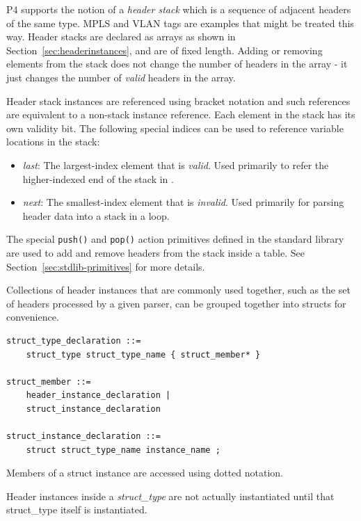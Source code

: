 \documentclass[12pt]{article}
\begin{document}

P4 supports the notion of a \textit{header stack} which is a sequence of
adjacent headers of the same type. MPLS and VLAN tags are examples that might
be treated this way.  Header stacks are declared as arrays as shown in
Section~\ref{sec:headerinstances}, and are of fixed length. Adding or removing
elements from the stack does not change the number of headers in the array - it
just changes the number of \textit{valid} headers in the array.

Header stack instances are referenced using bracket notation and such
references are equivalent to a non-stack instance reference. Each
element in the stack has its own validity bit. The following special
indices can be used to reference variable locations in the stack:
\begin{itemize}
\item
\textit{last}: The largest-index element that is \textit{valid}.
Used primarily to refer the higher-indexed end of the stack in \matchaction.
\item
\textit{next}: The smallest-index element that is \textit{invalid}.
Used primarily for parsing header data into a stack in a loop.
\end{itemize}
The special \texttt{push()} and \texttt{pop()} action primitives defined
in the standard library are used to add and remove headers from the stack
inside a \matchaction table. See Section~\ref{sec:stdlib-primitives} for more
details.


Collections of header instances that are commonly used together, such
as the set of headers processed by a given parser, can be grouped together
into structs for convenience.

\begin{lstlisting}[style=BNFstyle]
struct_type_declaration ::=
    struct_type struct_type_name { struct_member* }

struct_member ::=
    header_instance_declaration |
    struct_instance_declaration

struct_instance_declaration ::=
    struct struct_type_name instance_name ;
\end{lstlisting}

Members of a struct instance are accessed using dotted notation.

Header instances inside a \textit{struct_type} are not actually instantiated
until that struct_type itself is instantiated.
\end{document}

